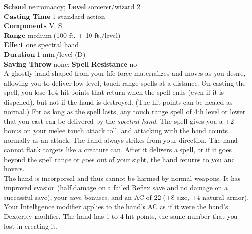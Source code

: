 \textbf{School} necromancy; \textbf{Level} sorcerer/wizard 2\\
\textbf{Casting Time} 1 standard action\\
\textbf{Components} V, S\\
\textbf{Range }medium (100 ft. + 10 ft./level)\\
\textbf{Effect} one spectral hand\\
\textbf{Duration} 1 min./level (D)\\
\textbf{Saving Throw} none; \textbf{Spell Resistance} no\\
A ghostly hand shaped from your life force materializes and moves as you desire, allowing you to deliver low-level, touch range spells at a distance. On casting the spell, you lose 1d4 hit points that return when the spell ends (even if it is dispelled), but not if the hand is destroyed. (The hit points can be healed as normal.) For as long as the spell lasts, any touch range spell of 4th level or lower that you cast can be delivered by the \textit{spectral hand}. The spell gives you a +2 bonus on your melee touch attack roll, and attacking with the hand counts normally as an attack. The hand always strikes from your direction. The hand cannot flank targets like a creature can. After it delivers a spell, or if it goes beyond the spell range or goes out of your sight, the hand returns to you and hovers.\\
The hand is incorporeal and thus cannot be harmed by normal weapons. It has improved evasion (half damage on a failed Reflex save and no damage on a successful save), your save bonuses, and an AC of 22 (+8 size, +4 natural armor). Your Intelligence modifier applies to the hand's AC as if it were the hand's Dexterity modifier. The hand has 1 to 4 hit points, the same number that you lost in creating it.\\
